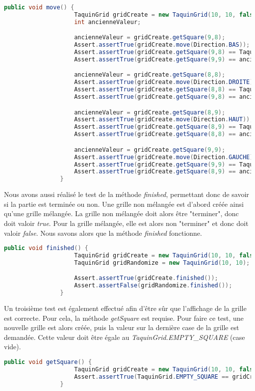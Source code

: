 			\begin{lstlisting}[gobble=12, caption=Test Moved(), language=java, label=TestMoved]
				public void move() {
					TaquinGrid gridCreate = new TaquinGrid(10, 10, false);
					int ancienneValeur;

					ancienneValeur = gridCreate.getSquare(9,8);
					Assert.assertTrue(gridCreate.move(Direction.BAS));
					Assert.assertTrue(gridCreate.getSquare(9,8) == TaquinGrid.EMPTY_SQUARE);
					Assert.assertTrue(gridCreate.getSquare(9,9) == ancienneValeur);

					ancienneValeur = gridCreate.getSquare(8,8);
					Assert.assertTrue(gridCreate.move(Direction.DROITE));
					Assert.assertTrue(gridCreate.getSquare(8,8) == TaquinGrid.EMPTY_SQUARE);
					Assert.assertTrue(gridCreate.getSquare(9,8) == ancienneValeur);

					ancienneValeur = gridCreate.getSquare(8,9);
					Assert.assertTrue(gridCreate.move(Direction.HAUT));
					Assert.assertTrue(gridCreate.getSquare(8,9) == TaquinGrid.EMPTY_SQUARE);
					Assert.assertTrue(gridCreate.getSquare(8,8) == ancienneValeur);

					ancienneValeur = gridCreate.getSquare(9,9);
					Assert.assertTrue(gridCreate.move(Direction.GAUCHE));
					Assert.assertTrue(gridCreate.getSquare(9,9) == TaquinGrid.EMPTY_SQUARE);
					Assert.assertTrue(gridCreate.getSquare(8,9) == ancienneValeur);
				}
			\end{lstlisting}

			Nous avons aussi réalisé le test de la méthode \textit{finished}, permettant donc de savoir si la partie est terminée ou non. Une grille non mélangée est d'abord créée ainsi qu'une grille mélangée. La grille non mélangée doit alors être "terminer", donc doit valoir \textit{true}. Pour la grille mélangée, elle est alors non "terminer" et donc doit valoir \textit{false}. Nous savons alors que la méthode \textit{finished} fonctionne.

			\begin{lstlisting}[gobble=12, language=java, caption=Teste de la méthode finished()]
				public void finished() {
					TaquinGrid gridCreate = new TaquinGrid(10, 10, false);
					TaquinGrid gridRandomize = new TaquinGrid(10, 10);

					Assert.assertTrue(gridCreate.finished());
					Assert.assertFalse(gridRandomize.finished());
				}
			\end{lstlisting}

			Un troisième test est également effectué afin d'être sûr que l'affichage de la grille est correcte. Pour cela, la méthode \textit{getSquare} est requise. Pour faire ce test, une nouvelle grille est alors créée, puis la valeur sur la dernière case de la grille est demandée. Cette valeur doit être égale au \textit{TaquinGrid.EMPTY\_SQUARE} (case vide).

			\begin{lstlisting}[gobble=12, language=java, caption=Teste getSquare()]
				public void getSquare() {
					TaquinGrid gridCreate = new TaquinGrid(10, 10, false);
					Assert.assertTrue(TaquinGrid.EMPTY_SQUARE == gridCreate.getSquare(9, 9));
				}
			\end{lstlisting}
